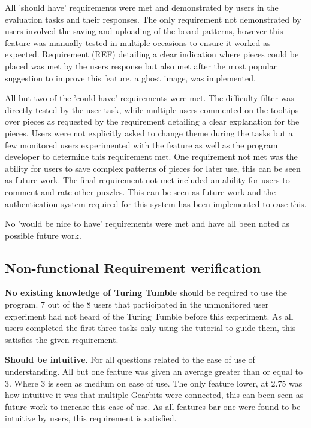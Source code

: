 \documentclass{l4proj}
\begin{document}
All 'should have' requirements were met and demonstrated by users in the evaluation tasks and their responses. The only requirement not demonstrated by users involved the saving and uploading of the board patterns, however this feature was manually tested in multiple occasions to ensure it worked as expected. Requirement (REF) detailing a clear indication where pieces could be placed was met by the users response but also met after the most popular suggestion to improve this feature, a ghost image, was implemented.

All but two of the 'could have' requirements were met. The difficulty filter was directly tested by the user task, while multiple users commented on the tooltips over pieces as requested by the requirement detailing a clear explanation for the pieces. Users were not explicitly asked to change theme during the tasks but a few monitored users experimented with the feature as well as the program developer to determine this requirement met. One requirement not met was the ability for users to save complex patterns of pieces for later use, this can be seen as future work. The final requirement not met included an ability for users to comment and rate other puzzles. This can be seen as future work and the authentication system required for this system has been implemented to ease this.

No 'would be nice to have' requirements were met and have all been noted as possible future work.

\subsection{Non-functional Requirement verification}
\textbf{No existing knowledge of Turing Tumble} should be required to use the program. 7 out of the 8 users that participated in the unmonitored user experiment had not heard of the Turing Tumble before this experiment. As all users completed the first three tasks only using the tutorial to guide them, this satisfies the given requirement.

\textbf{Should be intuitive}. For all questions related to the ease of use of understanding. All but one feature was given an average greater than or equal to 3. Where 3 is seen as medium on ease of use. The only feature lower, at 2.75 was how intuitive it was that multiple Gearbits were connected, this can been seen as future work to increase this ease of use. As all features bar one were found to be intuitive by users, this requirement is satisfied. 
\end{document}
